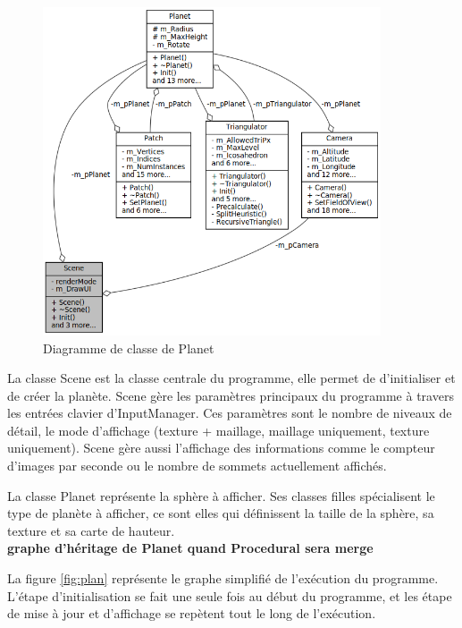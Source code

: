   \begin{figure}
  \centering
  \includegraphics[width=10cm]{img/uml_scene.png}
  \caption{Diagramme de classe de Planet}
  \label{fig:uml_scene}
  \end{figure}

  La classe Scene est la classe centrale du programme, elle permet de
  d'initialiser et de créer la planète. Scene gère les paramètres
  principaux du programme à travers les entrées clavier d'InputManager.
  Ces paramètres sont le nombre de niveaux de détail, le mode d'affichage
  (texture + maillage, maillage uniquement, texture uniquement). Scene
  gère aussi l'affichage des informations comme le compteur d'images par
  seconde ou le nombre de sommets actuellement affichés.
  
  La classe Planet représente la sphère à afficher. Ses classes filles
  spécialisent le type de planète à afficher, ce sont elles qui
  définissent la taille de la sphère, sa texture et sa carte de hauteur.\\
  \textbf{graphe d'héritage de Planet quand Procedural sera merge}
  
 
  La figure \ref{fig:plan} représente le graphe simplifié de
  l'exécution du programme. L'étape d'initialisation se fait une seule
  fois au début du programme, et les étape de mise à jour et d'affichage
  se repètent tout le long de l'exécution.
  
